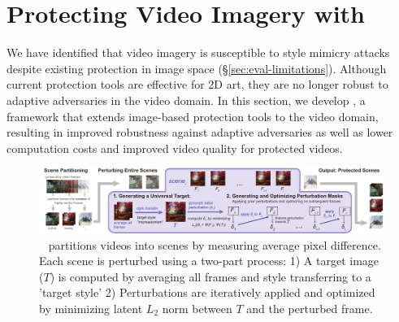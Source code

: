\secspace

\section{Protecting Video Imagery with \system{}}
\label{sec:method}
We have identified that video imagery is susceptible to style mimicry attacks
despite existing protection in image space (\S\ref{sec:eval-limitations}).
Although current protection tools are effective for 2D art, they are no longer robust
to adaptive adversaries in the video domain. In this section, we
develop \system, a framework that extends image-based protection tools to the video
domain, resulting in improved robustness against adaptive adversaries as well
as lower computation costs and improved video quality for protected videos.

\begin{table}[t]
  \centering
  \caption{Human feedback (Protection Success Rate) shows perturbation
    removal can significantly reduce effects of protection tools 
    against style mimicry attacks. Note baseline PSR for original,
    unprotected frames is 17.65 $\pm$ 1.10.}
\label{tab:user-study-removal-results}
\vspace{-0.2in}
\end{table}

\begin{figure}[t]
  \centering
  \includegraphics[width=1\textwidth]{plots/system-design-02-eps-converted-to.pdf}
  \vspace{-0.25in}
  \caption{\system~ partitions videos into scenes by measuring average pixel difference. Each scene is perturbed using a two-part process: 1) A target image ($T$) is computed by averaging all frames and style transferring to a 'target style' 2) Perturbations are iteratively applied and optimized by minimizing latent $L_2$ norm between $T$ and the perturbed frame.}
  \label{fig:system-design}
\end{figure}


